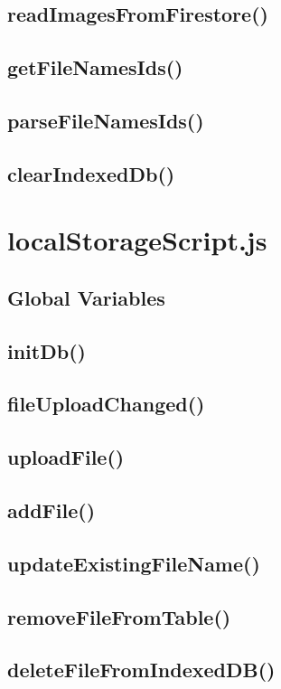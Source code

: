 \documentclass[letterpaper]{article}
\begin{document}
\subsection{readImagesFromFirestore()}
\subsection{getFileNamesIds()}
\subsection{parseFileNamesIds()}
\subsection{clearIndexedDb()}

\newpage

\section{localStorageScript.js}

\subsection{Global Variables}
\subsection{initDb()}
\subsection{fileUploadChanged()}
\subsection{uploadFile()}
\subsection{addFile()}
\subsection{updateExistingFileName()}
\subsection{removeFileFromTable()}
\subsection{deleteFileFromIndexedDB()}
\end{document}
